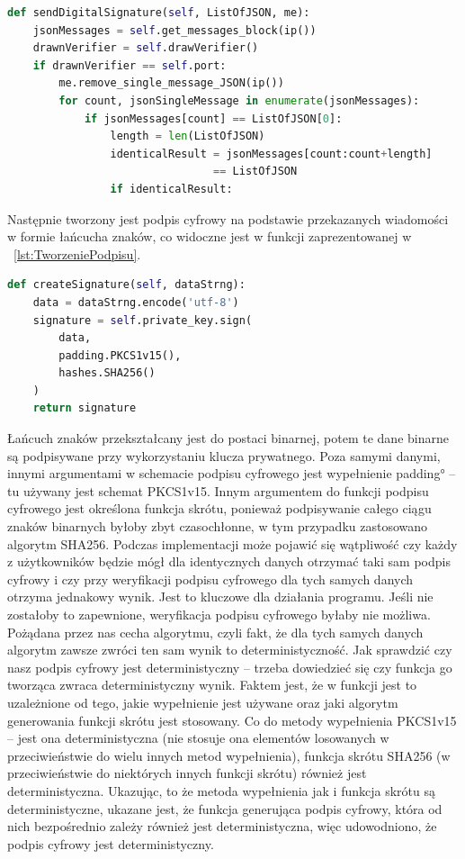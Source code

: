 \begin{lstlisting}[language=Python, extendedchars=true, caption={Funkcja wysyłania podpisu weryfikatora}, label={lst:WysylaniePodpisu}]
def sendDigitalSignature(self, ListOfJSON, me):
    jsonMessages = self.get_messages_block(ip())
    drawnVerifier = self.drawVerifier()
    if drawnVerifier == self.port:
        me.remove_single_message_JSON(ip())
        for count, jsonSingleMessage in enumerate(jsonMessages):
            if jsonMessages[count] == ListOfJSON[0]:
                length = len(ListOfJSON)
                identicalResult = jsonMessages[count:count+length]
                                == ListOfJSON
                if identicalResult:
\end{lstlisting}

Następnie tworzony jest podpis cyfrowy na podstawie przekazanych wiadomości w formie łańcucha znaków, co widoczne jest w funkcji zaprezentowanej w \lstlistingname{~\ref{lst:TworzeniePodpisu}}.

\begin{lstlisting}[language=Python, extendedchars=true, caption={Funkcja tworzenia podpisu weryfikatora}, label={lst:TworzeniePodpisu}]
def createSignature(self, dataStrng):
    data = dataStrng.encode('utf-8')
    signature = self.private_key.sign(
        data,
        padding.PKCS1v15(),
        hashes.SHA256()
    )
    return signature
\end{lstlisting}
 Łańcuch znaków przekształcany jest do postaci binarnej, potem te dane binarne są podpisywane przy wykorzystaniu klucza prywatnego. Poza samymi danymi, innymi argumentami w schemacie podpisu cyfrowego jest wypełnienie \ang{padding} – tu używany jest schemat PKCS1v15. Innym argumentem do funkcji podpisu cyfrowego jest określona funkcja skrótu, ponieważ podpisywanie całego ciągu znaków binarnych byłoby zbyt czasochłonne, w tym przypadku zastosowano algorytm SHA256. Podczas implementacji może pojawić się wątpliwość czy każdy z użytkowników będzie mógł dla identycznych danych otrzymać taki sam podpis cyfrowy i czy przy weryfikacji podpisu cyfrowego dla tych samych danych otrzyma jednakowy wynik. Jest to kluczowe dla działania programu. Jeśli nie zostałoby to zapewnione, weryfikacja podpisu cyfrowego byłaby nie możliwa. Pożądana przez nas cecha algorytmu, czyli fakt, że dla tych samych danych algorytm zawsze zwróci ten sam wynik to deterministyczność. Jak sprawdzić czy nasz podpis cyfrowy jest deterministyczny – trzeba dowiedzieć się czy funkcja go tworząca zwraca deterministyczny wynik. Faktem jest, że w funkcji jest to uzależnione od tego, jakie wypełnienie jest używane oraz jaki algorytm generowania funkcji skrótu jest stosowany. Co do metody wypełnienia PKCS1v15 – jest ona deterministyczna (nie stosuje ona elementów losowanych w przeciwieństwie do wielu innych metod wypełnienia), funkcja skrótu SHA256 (w przeciwieństwie do niektórych innych funkcji skrótu) również jest deterministyczna. Ukazując, to że metoda wypełnienia jak i funkcja skrótu są deterministyczne, ukazane jest, że funkcja generująca podpis cyfrowy, która od nich bezpośrednio zależy również jest deterministyczna, więc udowodniono, że podpis cyfrowy jest deterministyczny.

